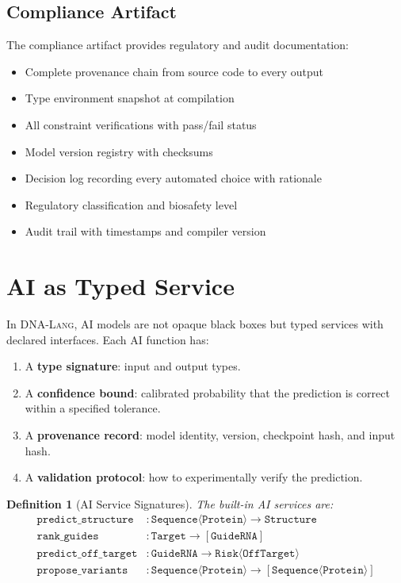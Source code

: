 \documentclass[12pt,a4paper]{article}
\newtheorem{definition}[theorem]{Definition}
\newcommand{\DNALang}{\textsc{DNA-Lang}}
\newcommand{\ty}[1]{\texttt{#1}}
\begin{document}
\subsection{Compliance Artifact}

The compliance artifact provides regulatory and audit documentation:

\begin{itemize}
    \item Complete provenance chain from source code to every output
    \item Type environment snapshot at compilation
    \item All constraint verifications with pass/fail status
    \item Model version registry with checksums
    \item Decision log recording every automated choice with rationale
    \item Regulatory classification and biosafety level
    \item Audit trail with timestamps and compiler version
\end{itemize}


\section{AI as Typed Service}
\label{sec:ai-service}

In \DNALang{}, AI models are not opaque black boxes but typed services with declared interfaces. Each AI function has:

\begin{enumerate}
    \item A \textbf{type signature}: input and output types.
    \item A \textbf{confidence bound}: calibrated probability that the prediction is correct within a specified tolerance.
    \item A \textbf{provenance record}: model identity, version, checkpoint hash, and input hash.
    \item A \textbf{validation protocol}: how to experimentally verify the prediction.
\end{enumerate}

\begin{definition}[AI Service Signatures]
The built-in AI services are:
\begin{align*}
\texttt{predict\_structure} &: \ty{Sequence}\langle\ty{Protein}\rangle \to \ty{Structure} \\
\texttt{rank\_guides} &: \ty{Target} \to [\ty{GuideRNA}] \\
\texttt{predict\_off\_target} &: \ty{GuideRNA} \to \ty{Risk}\langle\ty{OffTarget}\rangle \\
\texttt{propose\_variants} &: \ty{Sequence}\langle\ty{Protein}\rangle \to [\ty{Sequence}\langle\ty{Protein}\rangle]
\end{align*}
\end{definition}
\end{document}
